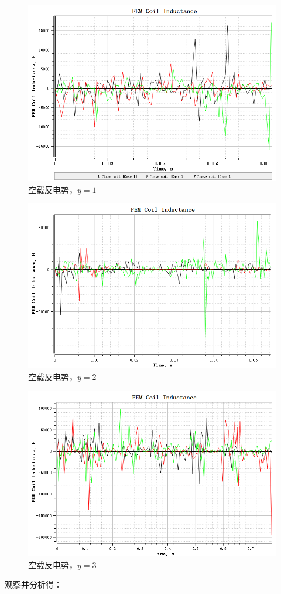 \documentclass{thuemp}
\begin{document}
\begin{figure}[H]
  \centering
  \includegraphics[width=1\linewidth]{./img/task2/FEM-y1.png}
  \caption{空载反电势，$y=1$}
\end{figure}
\begin{figure}[H]
  \centering
  \includegraphics[width=1\linewidth]{./img/task2/FEM-y2.png}
  \caption{空载反电势，$y=2$}
\end{figure}
\begin{figure}[H]
  \centering
  \includegraphics[width=1\linewidth]{./img/task2/FEM-y3.png}
  \caption{空载反电势，$y=3$}
\end{figure}
观察并分析得：
\end{document}
